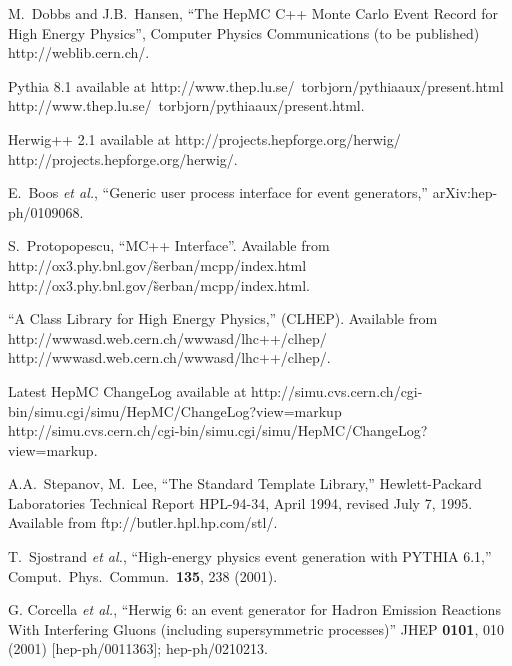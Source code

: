 \documentclass[11pt,letterpaper]{article}
\begin{document}
%
%

\begin{thebibliography}{99}

  M.~Dobbs and J.B.~Hansen, ``The HepMC C++ Monte Carlo Event Record for
  High Energy Physics'', Computer Physics Communications (to be
  published) 
  {http://weblib.cern.ch/}.  

  Pythia 8.1 available at \htmladdnormallink
  {http://www.thep.lu.se/~torbjorn/pythiaaux/present.html}
  {http://www.thep.lu.se/~torbjorn/pythiaaux/present.html}.

  Herwig++ 2.1 available at \htmladdnormallink
  {http://projects.hepforge.org/herwig/}
  {http://projects.hepforge.org/herwig/}.

E.~Boos {\it et al.},
``Generic user process interface for event generators,''
arXiv:hep-ph/0109068.

  S.~Protopopescu, ``MC++ Interface''.
  Available from \htmladdnormallink
  {http://ox3.phy.bnl.gov/\~serban/mcpp/index.html}
  {http://ox3.phy.bnl.gov/\~serban/mcpp/index.html}.

  ``A Class Library for High Energy Physics,'' (CLHEP).
  Available from 
  \htmladdnormallink
  {http://wwwasd.web.cern.ch/wwwasd/lhc++/clhep/}
  {http://wwwasd.web.cern.ch/wwwasd/lhc++/clhep/}.

  Latest HepMC ChangeLog available at  \htmladdnormallink
  {http://simu.cvs.cern.ch/cgi-bin/simu.cgi/simu/HepMC/ChangeLog?view=markup}
  {http://simu.cvs.cern.ch/cgi-bin/simu.cgi/simu/HepMC/ChangeLog?view=markup}.

  A.A.~Stepanov, M.~Lee, ``The Standard Template Library,''
  Hewlett-Packard Laboratories Technical Report HPL-94-34, April 1994,
  revised July 7, 1995.
  Available from 
  {ftp://butler.hpl.hp.com/stl/}.

  T.~Sjostrand {\it et al.}, 
  ``High-energy physics event generation with PYTHIA 6.1,''
  Comput.\ Phys.\ Commun.\  {\bf 135}, 238 (2001).

   G. Corcella {\it et al.}, 
  ``Herwig 6: an event generator for Hadron Emission Reactions
  With Interfering Gluons (including supersymmetric processes)''
  JHEP {\bf 0101}, 010 (2001) [hep-ph/0011363]; hep-ph/0210213.


\end{thebibliography}
\end{document}
